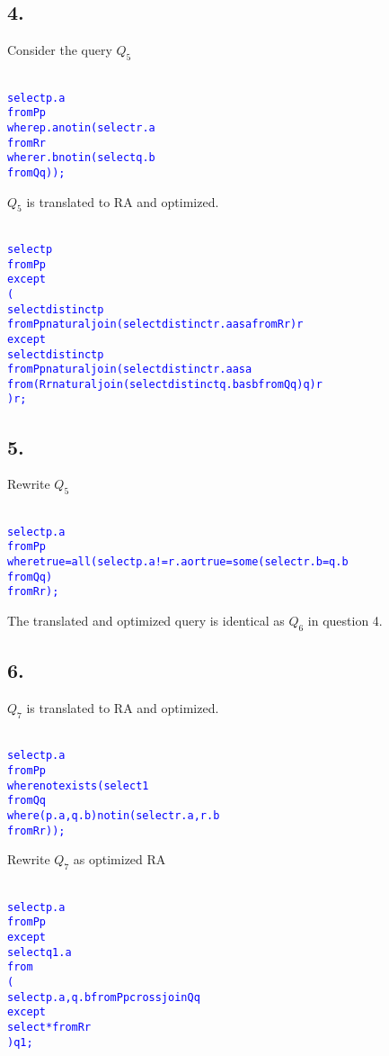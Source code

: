 \documentclass[10pt]{article}
\begin{document}
\subsection*{4.}
Consider the query $Q_5$ 
{
\begin{alltt}\textcolor{blue}{
select p.a
from   P p
where  p.a not in (select r.a
                   from   R r
                   where  r.b not in (select q.b
                                      from   Q q));}
\end{alltt}
}
$Q_5$ is translated to RA and optimized.
{
\begin{alltt}\textcolor{blue}{
select p
from P p
except
(
select distinct p
from P p natural join (select distinct r.a as a from R r)r
except
select distinct p
from P p natural join (select distinct r.a as a 
                       from (R r natural join (select distinct q.b as b from Q q)q)r
                       )r;}
\end{alltt}
}
\subsection*{5.}
Rewrite $Q_5$
{
\begin{alltt}\textcolor{blue}{
select p.a
from P p
where true = all (select p.a != r.a or true = some (select r.b = q.b
from Q q)
from R r);}
\end{alltt}
}
The translated and optimized query is identical as  $Q_6$ in question 4.
\subsection*{6.}
$Q_7$ is translated to RA and optimized.
{
\begin{alltt}\textcolor{blue}{
select p.a
from P p
where not exists (select 1
from Q q
where (p.a, q.b) not in (select r.a, r.b
from R r));
}
\end{alltt}
}

Rewrite $Q_7$ as optimized RA
{
\begin{alltt}\textcolor{blue}{
select p.a
from P p
except
select q1.a
from
(
select p.a, q.b from P p cross join Q q
except
select * from R r
)q1;
}
\end{alltt}
}
\end{document}
